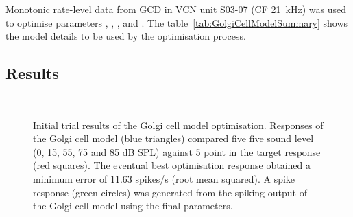
Monotonic rate-level data from GCD in VCN \citep{GhoshalKim:1996} unit S03-07
(CF 21~kHz) was used to optimise parameters \Gspon, \wLSRGLG, \wHSRGLG, and
\sANFGLG\@.  The table~\ref{tab:GolgiCellModelSummary} shows the model details
to be used by the optimisation process.

 
\clearpage







 \subsection{Results}



\begin{figure}[htb]
  \centering
  \\
  \caption{Initial trial results of the Golgi cell model optimisation.
    Responses of the Golgi cell model (blue triangles) compared five five sound level (0,
    15, 55, 75 and 85 dB SPL) 
    against 5 point in the target response (red squares). The eventual
    best optimisation response obtained a minimum error of 11.63
    spikes/s (root mean squared). A spike response
    (green circles) was generated from the spiking output of the Golgi
    cell model using the final parameters. 
  }\label{fig:GolgiTestResult}
\end{figure}


